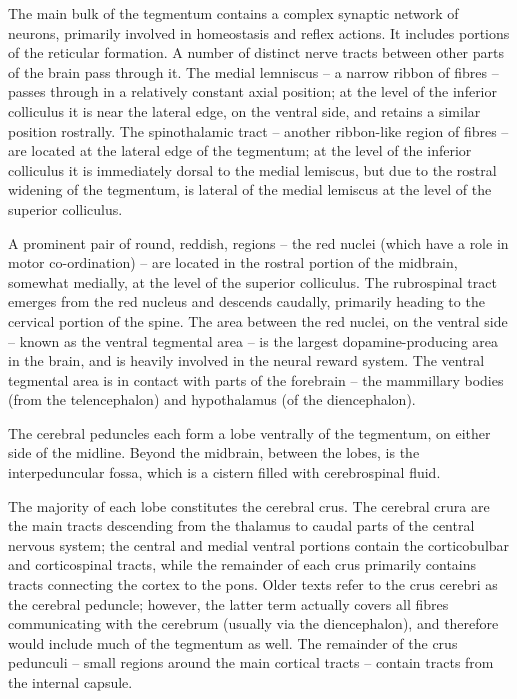 \documentclass[]{book}
\begin{document}
The main bulk of the tegmentum contains a complex synaptic network of neurons, primarily involved in homeostasis and reflex actions. It includes portions of the reticular formation. A number of distinct nerve tracts between other parts of the brain pass through it. The medial lemniscus -- a narrow ribbon of fibres -- passes through in a relatively constant axial position; at the level of the inferior colliculus it is near the lateral edge, on the ventral side, and retains a similar position rostrally. The spinothalamic tract -- another ribbon-like region of fibres -- are located at the lateral edge of the tegmentum; at the level of the inferior colliculus it is immediately dorsal to the medial lemiscus, but due to the rostral widening of the tegmentum, is lateral of the medial lemiscus at the level of the superior colliculus.

A prominent pair of round, reddish, regions -- the red nuclei (which have a role in motor co-ordination) -- are located in the rostral portion of the midbrain, somewhat medially, at the level of the superior colliculus. The rubrospinal tract emerges from the red nucleus and descends caudally, primarily heading to the cervical portion of the spine. The area between the red nuclei, on the ventral side -- known as the ventral tegmental area -- is the largest dopamine-producing area in the brain, and is heavily involved in the neural reward system. The ventral tegmental area is in contact with parts of the forebrain -- the mammillary bodies (from the telencephalon) and hypothalamus (of the diencephalon).

The cerebral peduncles each form a lobe ventrally of the tegmentum, on either side of the midline. Beyond the midbrain, between the lobes, is the interpeduncular fossa, which is a cistern filled with cerebrospinal fluid.

The majority of each lobe constitutes the cerebral crus. The cerebral crura are the main tracts descending from the thalamus to caudal parts of the central nervous system; the central and medial ventral portions contain the corticobulbar and corticospinal tracts, while the remainder of each crus primarily contains tracts connecting the cortex to the pons. Older texts refer to the crus cerebri as the cerebral peduncle; however, the latter term actually covers all fibres communicating with the cerebrum (usually via the diencephalon), and therefore would include much of the tegmentum as well. The remainder of the crus pedunculi -- small regions around the main cortical tracts -- contain tracts from the internal capsule.
\end{document}
